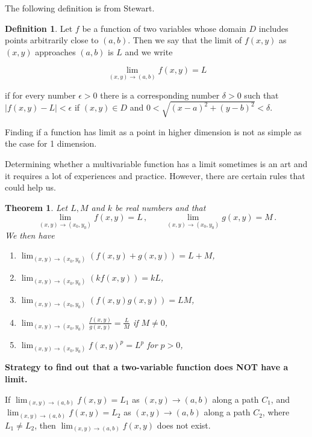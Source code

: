 \documentclass[
]{book}
\newtheorem{theorem}{Theorem}[chapter]
\theoremstyle{definition}
\newtheorem{definition}{Definition}[chapter]
\theoremstyle{definition}
\theoremstyle{definition}
\theoremstyle{definition}
\theoremstyle{remark}
\begin{document}
The following definition is from Stewart.

\begin{definition}
Let \(f\) be a function of two variables whose domain \(D\) includes points arbitrarily close to \((a,b)\). Then we say that the limit of \(f(x,y)\) as \((x,y)\) approaches \((a,b)\) is \(L\) and we write

\[\lim_{(x,y)\to(a,b)} f(x,y) = L\]

if for every number \(\epsilon > 0\) there is a corresponding number \(\delta > 0\) such that
\(|f(x,y) - L| < \epsilon\)
if \((x,y) \in D\) and \(0 < \sqrt{(x-a)^2 + (y-b)^2} < \delta\).
\end{definition}

Finding if a function has limit as a point in higher dimension is not as simple as
the case for 1 dimension.

Determining whether a multivariable function has a limit sometimes is an art
and it requires a lot of experiences and practice.
However, there are certain rules that could help us.

\begin{theorem}

Let \(L,M\) and \(k\) be real numbers and that
\begin{equation*}
    \lim_{(x,y) \to (x_0,y_0)} f(x,y) = L \,, \qquad 
    \lim_{(x,y) \to (x_0,y_0)} g(x,y) = M \,.
\end{equation*}
We then have

\begin{enumerate}
\def\labelenumi{\arabic{enumi}.}
\item
  \(\displaystyle \lim_{(x,y) \to (x_0,y_0)} (f(x,y) + g(x,y)) = L + M\),
\item
  \(\displaystyle \lim_{(x,y) \to (x_0,y_0)} (k f(x,y)) = kL\),
\item
  \(\displaystyle \lim_{(x,y) \to (x_0,y_0)} (f(x,y) g(x,y)) = LM\),
\item
  \(\displaystyle \lim_{(x,y) \to (x_0,y_0)} \frac{f(x,y)}{g(x,y)} = \frac{L}{M}\) if \(M \not= 0\),
\item
  \(\displaystyle \lim_{(x,y) \to (x_0,y_0)} {f(x,y)^p} = L^p\) for \(p>0\),
\end{enumerate}

\end{theorem}

\textbf{Strategy to find out that a two-variable function does NOT have a limit.}

If \(\lim_{(x,y) \to (a,b)} f(x,y) = L_1\) as \((x,y) \to (a,b)\) along a path \(C_1\),
and \(\lim_{(x,y) \to (a,b)} f(x,y) = L_2\) as \((x,y) \to (a,b)\) along a path \(C_2\),
where \(L_1 \neq L_2\), then \(\lim_{(x,y) \to (a,b)} f(x,y)\) does not exist.
\end{document}
